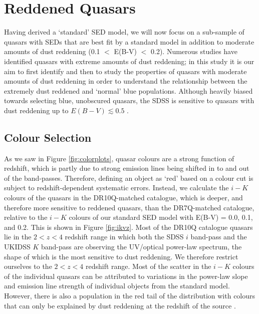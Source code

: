 \section{Reddened Quasars}

Having derived a `standard' SED model, we will now focus on a sub-sample of quasars with SEDs that are best fit by a standard model in addition to moderate amounts of dust reddening (0.1 $<$ E(B-V) $<$ 0.2). 
Numerous studies have identified quasars with extreme amounts of dust reddening; in this study it is our aim to first identify and then to study the properties of quasars with moderate amounts of dust reddening in order to understand the relationship between the extremely dust reddened and `normal' blue populations. 
Although heavily biased towards selecting blue, unobscured quasars, the SDSS is sensitive to quasars with dust reddening up to $E(B-V) \lesssim 0.5$ \citep{richards03}. 

\subsection{Colour Selection}

As we saw in Figure \ref{fig:colorplots}, quasar colours are a strong function of redshift, which is partly due to strong emission lines being shifted in to and out of the band-passes. 
Therefore, defining an object as `red' based on a colour cut is subject to redshift-dependent systematic errors. Instead, we calculate the $i-K$ colours of the quasars in the DR10Q-matched catalogue, which is deeper, and therefore more sensitive to reddened quasars, than the DR7Q-matched catalogue, relative to the $i-K$ colours of our standard SED model with E(B-V) = 0.0, 0.1, and 0.2. 
This is shown in Figure \ref{fig:ikvz}. 
Most of the DR10Q catalogue quasars lie in the $2 < z < 4$ redshift range in which both the SDSS $i$ band-pass and the UKIDSS $K$ band-pass are observing the UV/optical power-law spectrum, the shape of which is the most sensitive to dust reddening. 
We therefore restrict ourselves to the $2 < z < 4$ redshift range. 
Most of the scatter in the $i-K$ colours of the individual quasars can be attributed to variations in the power-law slope and emission line strength of individual objects from the standard model. 
However, there is also a population in the red tail of the distribution with colours that can only be explained by dust reddening at the redshift of the source \citep{hall04}. 

